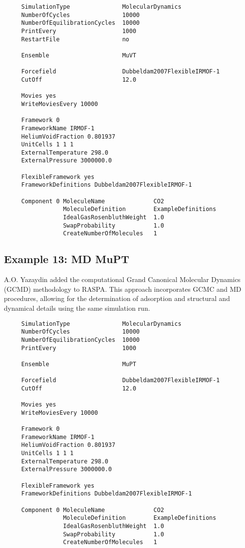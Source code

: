 \begin{tiny}
\begin{verbatim}
     SimulationType               MolecularDynamics
     NumberOfCycles               10000
     NumberOfEquilibrationCycles  10000
     PrintEvery                   1000
     RestartFile                  no

     Ensemble                     MuVT

     Forcefield                   Dubbeldam2007FlexibleIRMOF-1
     CutOff                       12.0

     Movies yes
     WriteMoviesEvery 10000

     Framework 0
     FrameworkName IRMOF-1
     HeliumVoidFraction 0.801937
     UnitCells 1 1 1
     ExternalTemperature 298.0
     ExternalPressure 3000000.0

     FlexibleFramework yes
     FrameworkDefinitions Dubbeldam2007FlexibleIRMOF-1

     Component 0 MoleculeName              CO2
                 MoleculeDefinition        ExampleDefinitions
                 IdealGasRosenbluthWeight  1.0
                 SwapProbability           1.0
                 CreateNumberOfMolecules   1
\end{verbatim}
\end{tiny}

\subsection*{Example 13: MD MuPT}

A.O. Yazaydin added the computational Grand Canonical Molecular Dynamics (GCMD) methodology to RASPA\cite{Loganathan2017,Loganathan2018}.
This approach incorporates GCMC and MD procedures, allowing for the determination of adsorption and structural and
dynamical details using the same simulation run.
\begin{tiny}
\begin{verbatim}
     SimulationType               MolecularDynamics
     NumberOfCycles               10000
     NumberOfEquilibrationCycles  10000
     PrintEvery                   1000

     Ensemble                     MuPT

     Forcefield                   Dubbeldam2007FlexibleIRMOF-1
     CutOff                       12.0

     Movies yes
     WriteMoviesEvery 10000

     Framework 0
     FrameworkName IRMOF-1
     HeliumVoidFraction 0.801937
     UnitCells 1 1 1
     ExternalTemperature 298.0
     ExternalPressure 3000000.0

     FlexibleFramework yes
     FrameworkDefinitions Dubbeldam2007FlexibleIRMOF-1

     Component 0 MoleculeName              CO2
                 MoleculeDefinition        ExampleDefinitions
                 IdealGasRosenbluthWeight  1.0
                 SwapProbability           1.0
                 CreateNumberOfMolecules   1
\end{verbatim}
\end{tiny}

